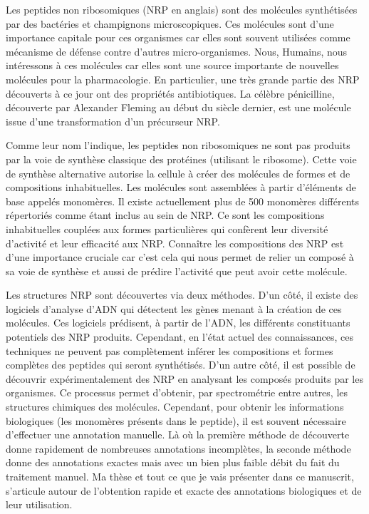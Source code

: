 Les peptides non ribosomiques (NRP en anglais) sont des molécules synthétisées par des bactéries et champignons microscopiques.
Ces molécules sont d'une importance capitale pour ces organismes car elles sont souvent utilisées comme mécanisme de défense contre d'autres micro-organismes.
Nous, Humains, nous intéressons à ces molécules car elles sont une source importante de nouvelles molécules pour la pharmacologie.
En particulier, une très grande partie des NRP découverts à ce jour ont des propriétés antibiotiques.
La célèbre pénicilline, découverte par Alexander Fleming au début du siècle dernier, est une molécule issue d'une transformation d'un précurseur NRP.

Comme leur nom l'indique, les peptides non ribosomiques ne sont pas produits par la voie de synthèse classique des protéines (utilisant le ribosome).
Cette voie de synthèse alternative autorise la cellule à créer des molécules de formes et de compositions inhabituelles.
Les molécules sont assemblées à partir d'éléments de base appelés monomères.
Il existe actuellement plus de 500 monomères différents répertoriés comme étant inclus au sein de NRP.
Ce sont les compositions inhabituelles couplées aux formes particulières qui confèrent leur diversité d'activité et leur efficacité aux NRP.
Connaître les compositions des NRP est d'une importance cruciale car c'est cela qui nous permet de relier un composé à sa voie de synthèse et aussi de prédire l'activité que peut avoir cette molécule.

Les structures NRP sont découvertes via deux méthodes.
D'un côté, il existe des logiciels d'analyse d'ADN qui détectent les gènes menant à la création de ces molécules.
Ces logiciels prédisent, à partir de l'ADN, les différents constituants potentiels des NRP produits.
Cependant, en l'état actuel des connaissances, ces techniques ne peuvent pas complètement inférer les compositions et formes complètes des peptides qui seront synthétisés.
D'un autre côté, il est possible de découvrir expérimentalement des NRP en analysant les composés produits par les organismes.
Ce processus permet d'obtenir, par spectrométrie entre autres, les structures chimiques des molécules.
Cependant, pour obtenir les informations biologiques (les monomères présents dans le peptide), il est souvent nécessaire d'effectuer une annotation manuelle.
Là où la première méthode de découverte donne rapidement de nombreuses annotations incomplètes, la seconde méthode donne des annotations exactes mais avec un bien plus faible débit du fait du traitement manuel.
Ma thèse et tout ce que je vais présenter dans ce manuscrit, s'articule autour de l'obtention rapide et exacte des annotations biologiques et de leur utilisation.

